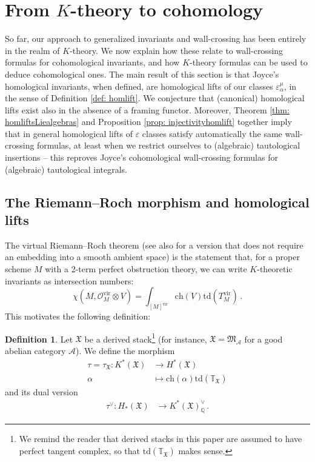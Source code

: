 \documentclass[12pt]{amsart}
\theoremstyle{definition}
\newtheorem{definition}{Definition}[section]
\newcommand{\BQ}{{\mathbb{Q}}}
\newcommand{\BT}{{\mathbb{T}}}
\newcommand{\CA}{{\mathcal A}}
\newcommand{\CO}{{\mathcal O}}
\newcommand{\1}{\mathbf 1}
\newcommand{\FM}{{\mathfrak{M}}}
\newcommand{\FX}{{\mathfrak{X}}}
\newcommand{\ch}{\mathrm{ch}}
\newcommand{\td}{\mathrm{td}}
\newcommand{\vir}{\mathrm{vir}}
\begin{document}


\section{From $K$-theory to cohomology}
\label{sec: Ktocoh}

So far, our approach to generalized invariants and wall-crossing has been entirely in the realm of $K$-theory. We now explain how these relate to wall-crossing formulas for cohomological invariants, and how $K$-theory formulas can be used to deduce cohomological ones. The main result of this section is that Joyce's homological invariants, when defined, are homological lifts of our classes $\varepsilon_\alpha^\mu$, in the sense of Definition \ref{def: homlift}. We conjecture that (canonical) homological lifts exist also in the absence of a framing functor. Moreover, Theorem \ref{thm: homliftsLiealgebras} and Proposition \ref{prop: injectivityhomlift} together imply that in general homological lifts of $\varepsilon$ classes satisfy automatically the same wall-crossing formulas, at least when we restrict ourselves to (algebraic) tautological insertions -- this reproves Joyce's cohomological wall-crossing formulas for (algebraic) tautological integrals.

\subsection{The Riemann--Roch morphism and homological lifts}\label{subsec: RRhomlift}

The virtual Riemann--Roch theorem \cite[Corollary 3.4]{FTriemannroch} (see also \cite[Theorem 6.12]{khan} for a version that does not require an embedding into a smooth ambient space) is the statement that, for a proper scheme $M$ with a 2-term perfect obstruction theory, we can write $K$-theoretic invariants as intersection numbers:
\[\chi(M, \CO_M^\vir\otimes V)=\int_{[M]^\vir}\ch(V)\td(T^\vir_M)\,.\]
This motivates the following definition:

\begin{definition}\label{def: RRmorphism}
Let $\FX$ be a derived stack\footnote{We remind the reader that derived stacks in this paper are assumed to have perfect tangent complex, so that $\td(\BT_\FX)$ makes sense.} (for instance, $\FX=\FM_\CA$ for a good abelian category $\CA$). We define the morphism
\begin{align*}
\tau=\tau_\FX\colon K^\ast(\FX)&\to H^\ast(\FX)\\
\alpha &\mapsto \ch(\alpha) \td(\BT_{\FX})
\end{align*}
and its dual version
\begin{align*}
\tau^\vee \colon H_\ast(\FX)&\to K^\ast(\FX)_\BQ^\vee\,.
\end{align*}
\end{definition}
\end{document}
